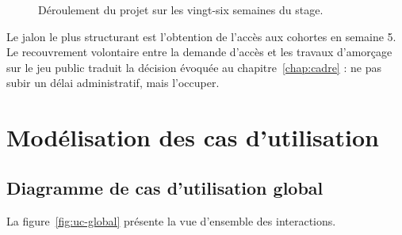 \begin{figure}[H]
\begin{ganttchart}
\end{ganttchart}
\vspace{0.3cm}
\caption[Diagramme de Gantt du projet]%
        {Déroulement du projet sur les vingt-six semaines du stage.}
\label{fig:gantt}
\end{figure}

Le jalon le plus structurant est l'obtention de l'accès aux cohortes en semaine 5. Le
recouvrement volontaire entre la demande d'accès et les travaux d'amorçage sur le jeu
public traduit la décision évoquée au chapitre~\ref{chap:cadre} : ne pas subir un
délai administratif, mais l'occuper.

\section{Modélisation des cas d'utilisation}

\subsection{Diagramme de cas d'utilisation global}

La figure~\ref{fig:uc-global} présente la vue d'ensemble des interactions.

